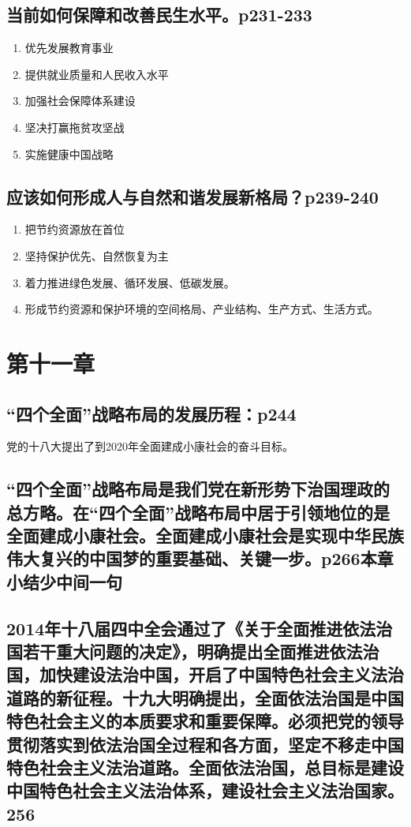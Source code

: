 \documentclass[UTF8]{ctexart}
\begin{document}
\subsection{当前如何保障和改善民生水平。p231-233}
\begin{enumerate}[(1)]
    \item 优先发展教育事业
    \item 提供就业质量和人民收入水平
    \item 加强社会保障体系建设
    \item 坚决打赢拖贫攻坚战
    \item 实施健康中国战略  
\end{enumerate}
\subsection{应该如何形成人与自然和谐发展新格局？p239-240}
\begin{enumerate}[(1)]
    \item 把节约资源放在首位
    \item 坚持保护优先、自然恢复为主
    \item 着力推进绿色发展、循环发展、低碳发展。
    \item 形成节约资源和保护环境的空间格局、产业结构、生产方式、生活方式。
\end{enumerate}
\section{第十一章}
\subsection{“四个全面”战略布局的发展历程：p244}
党的十八大提出了到2020年全面建成小康社会的奋斗目标。
\subsection{“四个全面”战略布局是我们党在新形势下治国理政的总方略。在“四个全面”战略布局中居于引领地位的是全面建成小康社会。全面建成小康社会是实现中华民族伟大复兴的中国梦的重要基础、关键一步。p266本章小结少中间一句}
\subsection{2014年十八届四中全会通过了《关于全面推进依法治国若干重大问题的决定》，明确提出全面推进依法治国，加快建设法治中国，开启了中国特色社会主义法治道路的新征程。十九大明确提出，全面依法治国是中国特色社会主义的本质要求和重要保障。必须把党的领导贯彻落实到依法治国全过程和各方面，坚定不移走中国特色社会主义法治道路。全面依法治国，总目标是建设中国特色社会主义法治体系，建设社会主义法治国家。256}
\end{document}
